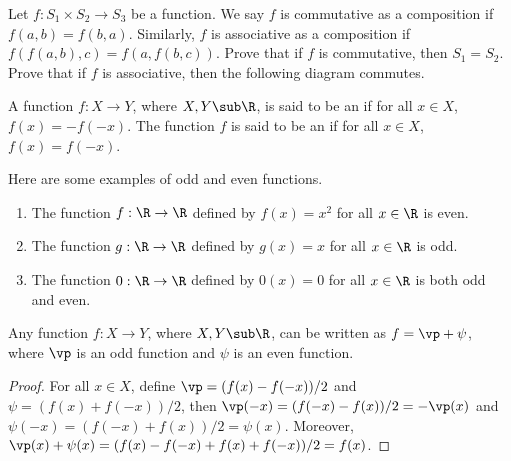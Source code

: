 \documentclass[10pt]{article}
\begin{document}
\begin{problem}
    Let $f:{S}_{1}\times{S}_{2}\to{S}_{3}$ be a function. We say $f$ is commutative as a composition if $f(a,b)=f(b,a)$. Similarly, $f$ is associative as a composition if $f(f(a,b),c)=f(a,f(b,c))$. Prove that if $f$ is commutative, then ${S}_{1}={S}_{2}$. Prove that if $f$ is associative, then the following diagram commutes.
    \begin{center}
    \end{center}
\end{problem}
\begin{definition}
    A function $f:X\to Y$, where $X,Y\sub\R$, is said to be an  if for all $x\in X$, $f(x)=-f(-x)$. The function $f$ is said to be an  if for all $x\in X$, $f(x)=f(-x)$. 
\end{definition}
\begin{example}
    Here are some examples of odd and even functions.
    \begin{enumerate}
        \item The function $f:\R\to\R$ defined by $f(x)={x}^{2}$ for all $x\in\R$ is even.
        \item The function $g:\R\to\R$ defined by $g(x)=x$ for all $x\in\R$ is odd.
        \item The function $0:\R\to\R$ defined by $0(x)=0$ for all $x\in\R$ is both odd and even.
    \end{enumerate}
\end{example}
\begin{proposition}
    Any function $f:X\to Y$, where $X,Y\sub\R$, can be written as $f=\vp+\psi$, where $\vp$ is an odd function and $\psi$ is an even function.
\end{proposition}
\begin{proof}
    For all $x\in X$, define $\vp=(f(x)-f(-x))/2$ and $\psi=(f(x)+f(-x))/2$, then $\vp(-x)=(f(-x)-f(x))/2=-\vp(x)$ and $\psi(-x)=(f(-x)+f(x))/2=\psi(x)$. Moreover, $\vp(x)+\psi(x)=(f(x)-f(-x)+f(x)+f(-x))/2=f(x)$.
\end{proof}
\end{document}
